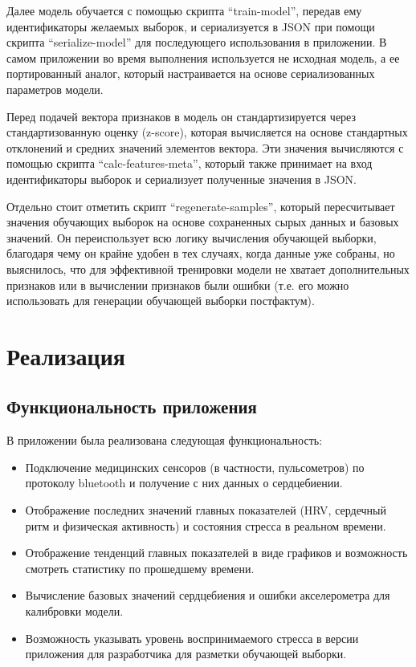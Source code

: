 \documentclass[14pt]{matmex-diploma-custom}
\begin{document}
Далее модель обучается с помощью скрипта ``train-model'', передав ему
идентификаторы желаемых выборок, и сериализуется в JSON при помощи скрипта
``serialize-model'' для последующего использования в приложении. В самом
приложении во время выполнения используется не исходная модель, а ее
портированный аналог, который настраивается на основе сериализованных параметров
модели.

Перед подачей вектора признаков в модель он стандартизируется через
стандартизованную оценку (z-score), которая вычисляется на основе стандартных
отклонений и средних значений элементов вектора. Эти значения вычисляются с
помощью скрипта ``calc-features-meta'', который также принимает на вход
идентификаторы выборок и сериализует полученные значения в JSON.

Отдельно стоит отметить скрипт ``regenerate-samples'', который пересчитывает
значения обучающих выборок на основе сохраненных сырых данных и базовых
значений. Он переиспользует всю логику вычисления обучающей выборки, благодаря
чему он крайне удобен в тех случаях, когда данные уже собраны, но выяснилось,
что для эффективной тренировки модели не хватает дополнительных признаков
или в вычислении признаков были ошибки (т.е. его можно использовать для
генерации обучающей выборки постфактум).

\section{Реализация}
\subsection{Функциональность приложения}
В приложении была реализована следующая функциональность:
\begin{itemize}
\item Подключение медицинских сенсоров (в частности, пульсометров) по протоколу
  bluetooth и получение с них данных о сердцебиении.
\item Отображение последних значений главных показателей (HRV, сердечный ритм и
  физическая активность) и состояния стресса в реальном времени.
\item Отображение тенденций главных показателей в виде графиков и возможность
  смотреть статистику по прошедшему времени.
\item Вычисление базовых значений сердцебиения и ошибки акселерометра для калибровки модели.
\item Возможность указывать уровень воспринимаемого стресса в версии приложения
  для разработчика для разметки обучающей выборки.
\end{itemize}
\end{document}
